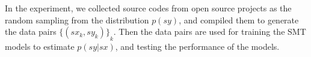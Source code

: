 \documentclass[senior,final,11pt]{iscs-thesis}
\newcommand{\argmax}{\mathop{\rm arg\,max}\limits}
\begin{document}
In the experiment, we collected source codes from open source projects as the random sampling from the distribution $ p(sy) $, 
and compiled them to generate the data pairs $ {\{(sx_k,sy_k)\}}_k $.
Then the data pairs are used for training the SMT models to estimate $p(sy|sx)$, and testing the performance of the models.




\end{document}

